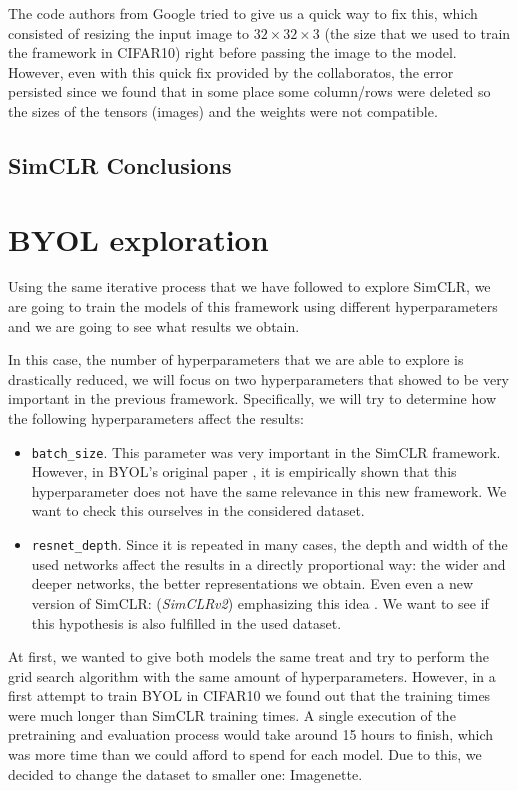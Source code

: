 The code authors from Google tried to give us a quick way to fix this, which consisted of resizing the input image to $32\times 32 \times 3$ (the size that we used to train the framework in CIFAR10) right before passing the image to the model. However, even with this quick fix provided by the collaboratos, the error persisted since we found that in some place some column/rows were deleted so the sizes of the tensors (images) and the weights were not compatible.


\subsection{SimCLR Conclusions}

\section{BYOL exploration}

Using the same iterative process that we have followed to explore SimCLR, we are going to train the models of this framework using different hyperparameters and we are going to see what results we obtain.

In this case, the number of hyperparameters that we are able to explore is drastically reduced, we will focus on two hyperparameters that showed to be very important in the previous framework. Specifically, we will try to determine how the following hyperparameters affect the results:

\begin{itemize}
\item \lstinline{batch_size}. This parameter was very important in the SimCLR framework. However, in BYOL's original paper \citep{grill2020bootstrap}, it is empirically shown that this hyperparameter does not have the same relevance in this new framework. We want to check this ourselves in the considered dataset.
\item \lstinline{resnet_depth}. Since it is repeated in many cases, the depth and width of the used networks affect the results in a directly proportional way: the wider and deeper networks, the better representations we obtain. Even even a new version of SimCLR: (\emph{SimCLRv2}) emphasizing this idea \citep{chen2020big}. We want to see if this hypothesis is also fulfilled in the used dataset.
\end{itemize}

At first, we wanted to give both models the same treat and try to perform the grid search algorithm with the same amount of hyperparameters. However, in a first attempt to train BYOL in CIFAR10 we found out that the training times were much longer than SimCLR training times. A single execution of the pretraining and evaluation process would take around 15 hours to finish, which was more time than we could afford to spend for each model. Due to this, we decided to change the dataset to smaller one: Imagenette. 

